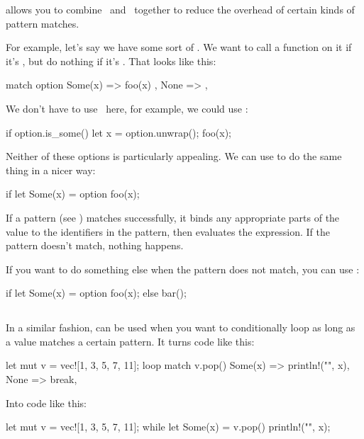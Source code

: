  allows you to combine \keyif\ and \keylet\ together to reduce the overhead of certain kinds of pattern matches.

\blank

For example, let's say we have some sort of . We want to call a function on it if it's , but do nothing if it's 
. That looks like this:

\begin{rustc}
match option {
    Some(x) => { foo(x) },
    None => {},
}
\end{rustc}

We don't have to use \match\ here, for example, we could use \keyif:

\begin{rustc}
if option.is_some() {
    let x = option.unwrap();
    foo(x);
}
\end{rustc}

Neither of these options is particularly appealing. We can use  to do the same thing in a nicer way:

\begin{rustc}
if let Some(x) = option {
    foo(x);
}
\end{rustc}

If a pattern (see ) matches successfully, it binds any appropriate parts of the value to the identifiers in 
the pattern, then evaluates the expression. If the pattern doesn't match, nothing happens.

\blank

If you want to do something else when the pattern does not match, you can use :

\begin{rustc}
if let Some(x) = option {
    foo(x);
} else {
    bar();
}
\end{rustc}

\subsection*{}

In a similar fashion,  can be used when you want to conditionally loop as long as a value matches a certain pattern. It 
turns code like this:

\begin{rustc}
let mut v = vec![1, 3, 5, 7, 11];
loop {
    match v.pop() {
        Some(x) =>  println!("{}", x),
        None => break,
    }
}
\end{rustc}

Into code like this:

\begin{rustc}
let mut v = vec![1, 3, 5, 7, 11];
while let Some(x) = v.pop() {
    println!("{}", x);
}
\end{rustc}
